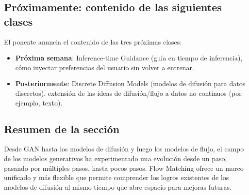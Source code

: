 \subsection{Próximamente: contenido de las siguientes clases}

El ponente anuncia el contenido de las tres próximas clases:
\begin{itemize}
    \item \textbf{Próxima semana}: Inference-time Guidance (guía en tiempo de inferencia), cómo inyectar preferencias del usuario sin volver a entrenar.
    \item \textbf{Posteriormente}: Discrete Diffusion Models (modelos de difusión para datos discretos), extensión de las ideas de difusión/flujo a datos no continuos (por ejemplo, texto).
\end{itemize}

\subsection{Resumen de la sección}

Desde GAN hasta los modelos de difusión y luego los modelos de flujo, el campo de los modelos generativos ha experimentado una evolución desde un paso, pasando por múltiples pasos, hasta pocos pasos. Flow Matching ofrece un marco unificado y más flexible que permite comprender los logros existentes de los modelos de difusión al mismo tiempo que abre espacio para mejoras futuras.
